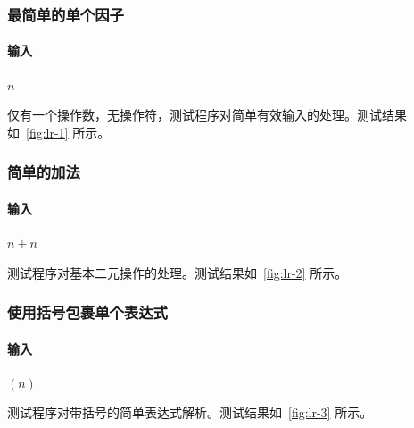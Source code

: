 \subsubsection{最简单的单个因子}
\paragraph{输入} $n$

仅有一个操作数，无操作符，测试程序对简单有效输入的处理。测试结果如~\autoref{fig:lr-1} 所示。

\subsubsection{简单的加法}
\paragraph{输入} $n+n$

测试程序对基本二元操作的处理。测试结果如~\autoref{fig:lr-2} 所示。

\subsubsection{使用括号包裹单个表达式}
\paragraph{输入} $(n)$

测试程序对带括号的简单表达式解析。测试结果如~\autoref{fig:lr-3} 所示。

